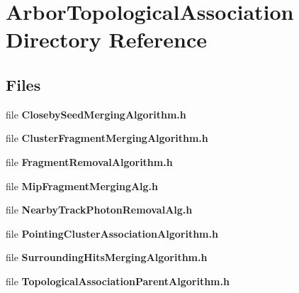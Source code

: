 \section{Arbor\+Topological\+Association Directory Reference}
\label{dir_354ad0ff4f7bf8e589b44fbc6a03dca0}
\subsection*{Files}
\begin{DoxyCompactItemize}
\item 
file {\bf Closeby\+Seed\+Merging\+Algorithm.\+h}
\item 
file {\bf Cluster\+Fragment\+Merging\+Algorithm.\+h}
\item 
file {\bf Fragment\+Removal\+Algorithm.\+h}
\item 
file {\bf Mip\+Fragment\+Merging\+Alg.\+h}
\item 
file {\bf Nearby\+Track\+Photon\+Removal\+Alg.\+h}
\item 
file {\bf Pointing\+Cluster\+Association\+Algorithm.\+h}
\item 
file {\bf Surrounding\+Hits\+Merging\+Algorithm.\+h}
\item 
file {\bf Topological\+Association\+Parent\+Algorithm.\+h}
\end{DoxyCompactItemize}
